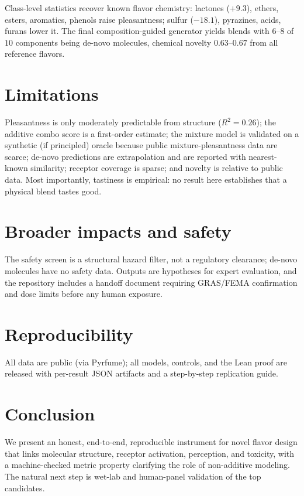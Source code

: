 \documentclass[11pt]{article}
\begin{document}
Class-level statistics recover known flavor chemistry: lactones ($+9.3$), ethers, esters,
aromatics, phenols raise pleasantness; sulfur ($-18.1$), pyrazines, acids, furans lower it. The
final composition-guided generator yields blends with $6$--$8$ of $10$ components being de-novo
molecules, chemical novelty $0.63$--$0.67$ from all reference flavors.

\section{Limitations}
Pleasantness is only moderately predictable from structure ($R^2 = 0.26$); the additive combo
score is a first-order estimate; the mixture model is validated on a synthetic (if principled)
oracle because public mixture-pleasantness data are scarce; de-novo predictions are
extrapolation and are reported with nearest-known similarity; receptor coverage is sparse;
and novelty is relative to public data. Most importantly, tastiness is empirical: no result
here establishes that a physical blend tastes good.

\section{Broader impacts and safety}
The safety screen is a structural hazard filter, not a regulatory clearance; de-novo molecules
have no safety data. Outputs are hypotheses for expert evaluation, and the repository includes a
handoff document requiring GRAS/FEMA confirmation and dose limits before any human exposure.

\section{Reproducibility}
All data are public (via Pyrfume); all models, controls, and the Lean proof are released with
per-result JSON artifacts and a step-by-step replication guide.

\section{Conclusion}
We present an honest, end-to-end, reproducible instrument for novel flavor design that links
molecular structure, receptor activation, perception, and toxicity, with a machine-checked
metric property clarifying the role of non-additive modeling. The natural next step is wet-lab
and human-panel validation of the top candidates.
\end{document}
